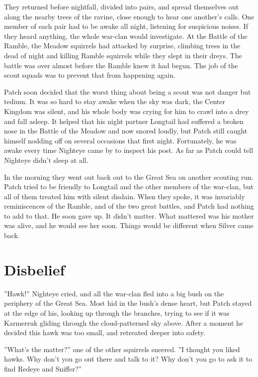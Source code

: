 \documentclass[12pt]{book}
\begin{document}
They returned before nightfall, divided into pairs, and spread themselves out along the nearby trees of the ravine, close enough to hear one another's calls. One member of each pair had to be awake all night, listening for suspicious noises. If they heard anything, the whole war-clan would investigate. At the Battle of the Ramble, the Meadow squirrels had attacked by surprise, climbing trees in the dead of night and killing Ramble squirrels while they slept in their dreys. The battle was over almost before the Ramble knew it had begun. The job of the scout squads was to prevent that from happening again.

Patch soon decided that the worst thing about being a scout was not danger but tedium. It was so hard to stay awake when the sky was dark, the Center Kingdom was silent, and his whole body was crying for him to crawl into a drey and fall asleep. It helped that his night partner Longtail had suffered a broken nose in the Battle of the Meadow and now snored loudly, but Patch still caught himself nodding off on several occasions that first night. Fortunately, he was awake every time Nighteye came by to inspect his post. As far as Patch could tell Nighteye didn't sleep at all.

In the morning they went out back out to the Great Sea on another scouting run. Patch tried to be friendly to Longtail and the other members of the war-clan, but all of them treated him with silent disdain. When they spoke, it was invariably reminiscences of the Ramble, and of the two great battles, and Patch had nothing to add to that. He soon gave up. It didn't matter. What mattered was his mother was alive, and he would see her soon. Things would be different when Silver came back.


\section{Disbelief}

''Hawk!'' Nighteye cried, and all the war-clan fled into a big bush on the periphery of the Great Sea. Most hid in the bush's dense heart, but Patch stayed at the edge of his, looking up through the branches, trying to see if it was Karmerruk gliding through the cloud-patterned sky above. After a moment he decided this hawk was too small, and retreated deeper into safety.

''What's the matter?'' one of the other squirrels sneered. ''I thought you liked hawks. Why don't you go out there and talk to it? Why don't you go to ask it to find Redeye and Sniffer?''
\end{document}

